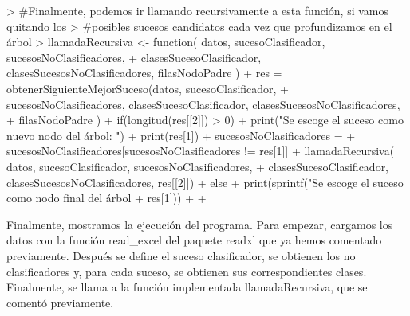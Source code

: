 \documentclass[parskip=full]{scrartcl}
\begin{document}
\begin{Schunk}
\begin{Sinput}
> #Finalmente, podemos ir llamando recursivamente a esta función, si vamos quitando los
> #posibles sucesos candidatos cada vez que profundizamos en el árbol
> llamadaRecursiva <- function( datos, sucesoClasificador, sucesosNoClasificadores, 
+ clasesSucesoClasificador, clasesSucesosNoClasificadores, filasNodoPadre ){
+   res = obtenerSiguienteMejorSuceso(datos, sucesoClasificador, 
+   sucesosNoClasificadores, clasesSucesoClasificador, clasesSucesosNoClasificadores, 
+   filasNodoPadre )
+   if(longitud(res[[2]]) > 0) {
+     print("Se escoge el suceso como nuevo nodo del árbol: ")
+     print(res[1])
+     sucesosNoClasificadores = 
+ 	sucesosNoClasificadores[sucesosNoClasificadores != res[1]]
+     llamadaRecursiva( datos, sucesoClasificador, sucesosNoClasificadores, 
+ 	clasesSucesoClasificador, clasesSucesosNoClasificadores, res[[2]])
+   } else {
+ print(sprintf("Se escoge el suceso como nodo final del árbol %
+ 	res[1]))
+   }
+ }
\end{Sinput}
\end{Schunk}


Finalmente, mostramos la ejecución del programa. Para empezar, cargamos los datos con la función read\_excel del paquete readxl que ya hemos comentado previamente. Después se define el suceso clasificador, se obtienen los no clasificadores y, para cada suceso, se obtienen sus correspondientes clases. Finalmente, se llama a la función implementada llamadaRecursiva, que se comentó previamente.
\end{document}
